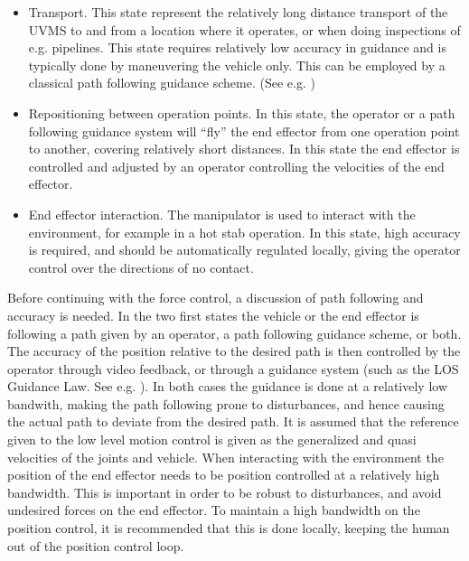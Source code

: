 \begin{itemize}
	\item Transport. This state represent the relatively long distance transport of the UVMS to and from a location where it operates, or when doing inspections of e.g. pipelines. This state requires relatively low accuracy in guidance and is typically done by maneuvering the vehicle only. This can be employed by a classical path following guidance scheme. (See e.g. \cite{fs})  
	\item Repositioning between operation points. In this state, the operator or a path following guidance system will ``fly'' the end effector from one operation point to another, covering relatively short distances. In this state the end effector is controlled and adjusted by an operator controlling the velocities of the end effector.
	\item End effector interaction. The manipulator is used to interact with the environment, for example in a hot stab operation. In this state, high accuracy is required, and should be automatically regulated locally, giving the operator control over the directions of no contact.
\end{itemize}
Before continuing with the force control, a discussion of path following and accuracy is needed. In the two first states the vehicle or the end effector is following a path given by an operator, a path following guidance scheme, or both. The accuracy of the position relative to the desired path is then controlled by the operator through video feedback, or through a guidance system (such as the LOS Guidance Law. See e.g. \cite{fs}). In both cases the guidance is done at a relatively low bandwith, making the path following prone to disturbances, and hence causing the actual path to deviate from the desired path. It is assumed that the reference given to the low level motion control is given as the generalized and quasi velocities of the joints and vehicle. When interacting with the environment the position of the end effector needs to be position controlled at a relatively high bandwidth. This is important in order to be robust to disturbances, and avoid undesired forces on the end effector. To maintain a high bandwidth on the position control, it is recommended that this is done locally, keeping the human out of the position control loop.

